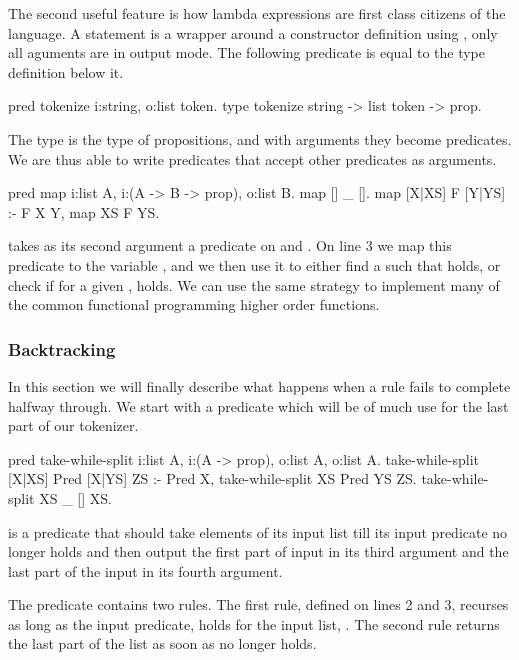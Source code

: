 \documentclass[thesis.tex]{subfiles}
\begin{document}
{{{The second useful feature is how lambda expressions are first class citizens of the language. A  statement is a wrapper around a constructor definition using , only all aguments are in output mode. The following predicate is equal to the type definition below it.
\begin{elpicode}
  pred tokenize i:string, o:list token.
  type tokenize string -> list token -> prop.
\end{elpicode}
The  type is the type of propositions, and with arguments they become predicates. We are thus able to write predicates that accept other predicates as arguments.
\begin{elpicode}
  pred map i:list A, i:(A -> B -> prop), o:list B.
  map [] _ [].
  map [X|XS] F [Y|YS] :- F X Y, map XS F YS.
\end{elpicode}
 takes as its second argument a predicate on  and . On line 3 we map this predicate to the variable , and we then use it to either find a  such that  holds, or check if for a given ,  holds. We can use the same strategy to implement many of the common functional programming higher order functions.

\subsubsection{Backtracking} \label{sssec:backtracking}
In this section we will finally describe what happens when a rule fails to complete halfway through. We start with a predicate which will be of much use for the last part of our tokenizer.
\begin{elpicode}
  pred take-while-split i:list A, i:(A -> prop), o:list A, o:list A.
  take-while-split [X|XS] Pred [X|YS] ZS :- Pred X,
    take-while-split XS Pred YS ZS.
  take-while-split XS _ [] XS.
\end{elpicode}
 is a predicate that should take elements of its input list till its input predicate no longer holds and then output the first part of input in its third argument and the last part of the input in its fourth argument.

The predicate contains two rules. The first rule, defined on lines 2 and 3, recurses as long as the input predicate,  holds for the input list, \elpiinline{[X|XS]}. The second rule returns the last part of the list as soon as  no longer holds.

}}}
\end{document}
